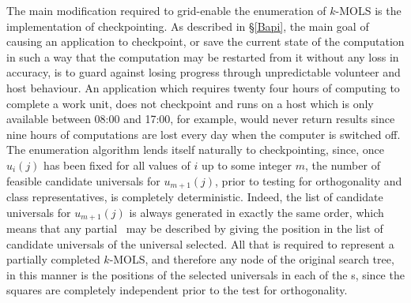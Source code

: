 The main modification required to grid-enable the   enumeration of $k$-MOLS is the implementation of checkpointing. As described in \S\ref{Bapi}, the main goal of causing an application to checkpoint, or save the current state of the computation in such a way that the computation may be restarted from it without any loss in accuracy, is to guard against losing progress through unpredictable volunteer and host behaviour. An application which requires twenty four hours of computing to complete a work unit, does not checkpoint and runs on a host which is only available between 08:00 and 17:00, for example, would never return results since nine hours of computations are lost every day when the computer is switched off. The enumeration algorithm lends itself naturally to checkpointing, since, once $u_i(j)$ has been fixed for all values of $i$ up to some integer $m$, the number of feasible candidate universals for $u_{m+1}(j)$, prior to testing for orthogonality and class representatives, is completely deterministic. Indeed, the   list of candidate universals for $u_{m+1}(j)$ is always generated in exactly the same order, which means that any partial \lat \ may be described by giving the position in the list of candidate universals of the universal selected. 
All that is required to represent a partially completed $k$-MOLS, and therefore any node of the original search tree, in this manner is the positions of the selected universals in each of the \lat s, since the squares are completely independent prior to the test for orthogonality.

